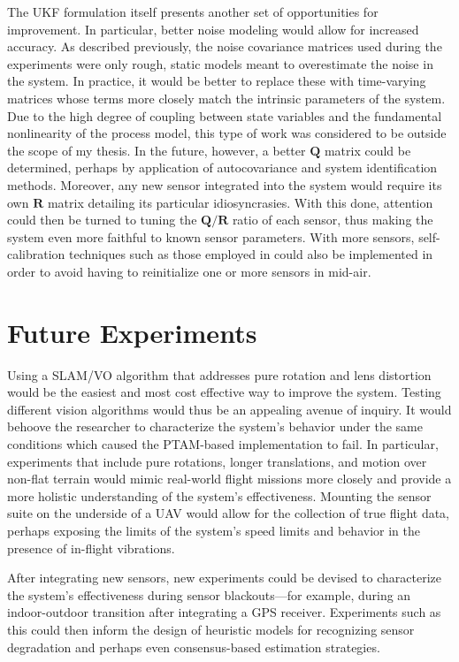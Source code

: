 The UKF formulation itself presents another set of opportunities for improvement. In particular, better noise modeling would allow for increased accuracy. As described previously, the noise covariance matrices used during the experiments were only rough, static models meant to overestimate the noise in the system. In practice, it would be better to replace these with time-varying matrices whose terms more closely match the intrinsic parameters of the system. Due to the high degree of coupling between state variables and the fundamental nonlinearity of the process model, this type of work was considered to be outside the scope of my thesis. In the future, however, a better $\mathbf{Q}$ matrix could be determined, perhaps by application of autocovariance and system identification methods. Moreover, any new sensor integrated into the system would require its own $\mathbf{R}$ matrix detailing its particular idiosyncrasies. With this done, attention could then be turned to tuning the $\mathbf{Q} / \mathbf{R}$ ratio of each sensor, thus making the system even more faithful to known sensor parameters. With more sensors, self-calibration techniques such as those employed in \cite{Weiss2012} could also be implemented in order to avoid having to reinitialize one or more sensors in mid-air.

\section{Future Experiments}

Using a SLAM/VO algorithm that addresses pure rotation and lens distortion would be the easiest and most cost effective way to improve the system. Testing different vision algorithms would thus be an appealing avenue of inquiry. It would behoove the researcher to characterize the system's behavior under the same conditions which caused the PTAM-based implementation to fail. In particular, experiments that include pure rotations, longer translations, and motion over non-flat terrain would mimic real-world flight missions more closely and provide a more holistic understanding of the system's effectiveness. Mounting the sensor suite on the underside of a UAV would allow for the collection of true flight data, perhaps exposing the limits of the system's speed limits and behavior in the presence of in-flight vibrations.

After integrating new sensors, new experiments could be devised to characterize the system's effectiveness during sensor blackouts---for example, during an indoor-outdoor transition after integrating a GPS receiver. Experiments such as this could then inform the design of heuristic models for recognizing sensor degradation and perhaps even consensus-based estimation strategies. 

